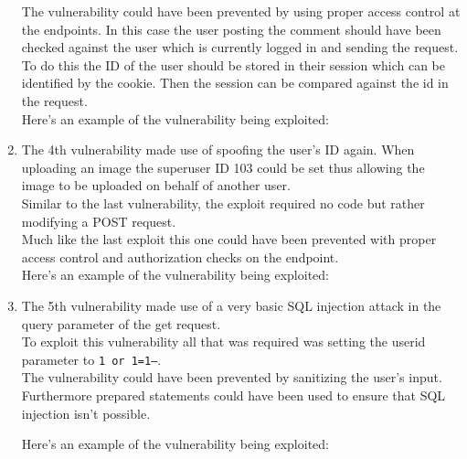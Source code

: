 \documentclass[fleqn, 12pt]{article}
\newcommand{\code}[2]{\colorbox{codegray}{\texttt{#2}}}
\begin{document}
\begin{enumerate}
        The vulnerability could have been prevented by using proper access control at the endpoints. In this case the user posting the comment should have been checked against the user which is currently logged in and sending the request. To do this the ID of the user should be stored in their session which can be identified by the cookie. Then the session can be compared against the id in the request.\\

        Here's an example of the vulnerability being exploited:


    \item
        The 4th vulnerability made use of spoofing the user's ID again. When uploading an image the superuser ID 103 could be set thus allowing the image to be uploaded on behalf of another user.\\

        Similar to the last vulnerability, the exploit required no code but rather modifying a POST request.\\

        Much like the last exploit this one could have been prevented with proper access control and authorization checks on the endpoint.\\

        Here's an example of the vulnerability being exploited:


    \item
        The 5th vulnerability made use of a very basic SQL injection attack in the query parameter of the get request.\\

        To exploit this vulnerability all that was required was setting the userid parameter to \code{sql}{1 or 1=1--}.\\

        The vulnerability could have been prevented by sanitizing the user's input. Furthermore prepared statements could have been used to ensure that SQL injection isn't possible.\\

        \newpage

        Here's an example of the vulnerability being exploited:



\end{enumerate}
\end{document}
